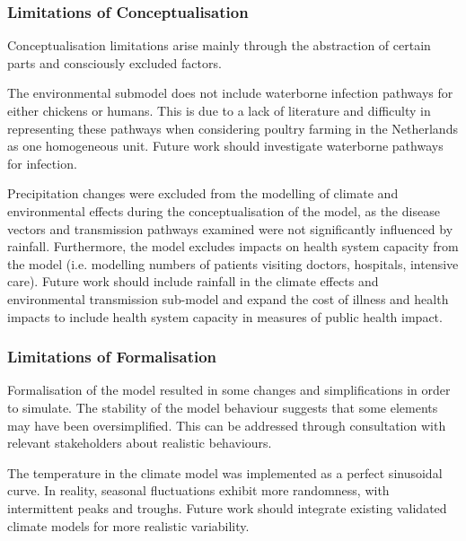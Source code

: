 

\subsubsection{Limitations of Conceptualisation}
Conceptualisation limitations arise mainly through the abstraction of certain parts and consciously excluded factors. %

The environmental submodel does not include waterborne infection pathways for either chickens or humans. This is due to a lack of literature and difficulty in representing these pathways when considering poultry farming in the Netherlands as one homogeneous unit. Future work should investigate waterborne pathways for infection. %

Precipitation changes were excluded from the modelling of climate and environmental effects during the conceptualisation of the model, as the disease vectors and transmission pathways examined were not significantly influenced by rainfall. Furthermore, the model excludes impacts on health system capacity from the model (i.e. modelling numbers of patients visiting doctors, hospitals, intensive care). Future work should include rainfall in the climate effects and environmental transmission sub-model and expand the cost of illness and health impacts to include health system capacity in measures of public health impact. 

\subsubsection{Limitations of Formalisation}
Formalisation of the model resulted in some changes and simplifications in order to simulate. The stability of the model behaviour suggests that some elements may have been oversimplified. This can be addressed through consultation with relevant stakeholders about realistic behaviours.

The temperature in the climate model was implemented as a perfect sinusoidal curve. In reality, seasonal fluctuations exhibit more randomness, with intermittent peaks and troughs. Future work should integrate existing validated climate models for more realistic variability.

